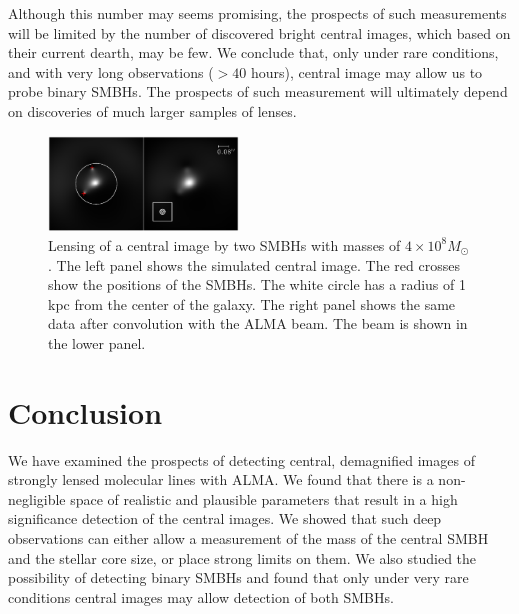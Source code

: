 \documentclass[chicago]{emulateapj}
\begin{document}
  Although this number may seems promising, the prospects of such measurements will be limited by the number of discovered bright central images, which based on their current dearth, may be few.
We conclude that, only under rare conditions, and with very long observations ($>40$ hours), central image may allow us to probe binary SMBHs. The prospects of such measurement will ultimately depend on discoveries of much larger samples of lenses.




\begin{figure}
\begin{center}
\centering
\includegraphics[trim= 20 0 20 0, width=0.45\textwidth]{figures/f_05.eps}
\centering
\end{center}
\caption{ Lensing of a central image by two SMBHs with masses of $4\times 10^8M_{\odot}$. The left panel shows the simulated central image. The red crosses show the positions of the SMBHs. The white circle has a radius of 1 kpc  from the center of the galaxy. The right panel shows the same data after convolution with the ALMA beam. The beam is shown in the lower panel.
\label{fig:5}}
\end{figure}



\section{Conclusion}
We have examined the prospects of detecting central, demagnified images of strongly lensed molecular lines with ALMA. We found that there is a non-negligible space of realistic and plausible parameters that result in a high significance detection of the central images. We showed that such deep observations can either allow a measurement of the mass of the central SMBH and the stellar core size, or place strong limits on them.
We also studied the possibility of detecting binary SMBHs and found that only under very rare conditions central images may allow detection of both SMBHs. 
\end{document}
